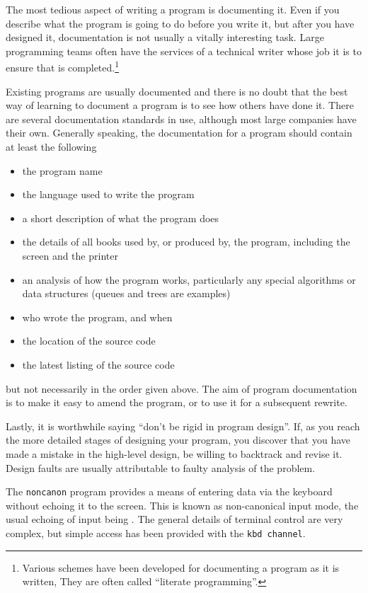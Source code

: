 The most tedious aspect of writing a program is documenting it.  Even
if you describe what the program is going to do before you write it,
but after you have designed it, documentation is not usually a
vitally interesting task. Large programming teams often have the
services of a technical writer whose job it is to ensure that
 is
completed.\footnote{Various schemes have been developed for
documenting a program as it is written, They are often called
``literate programming''.}

Existing programs are usually documented and there is no doubt that
the best way of learning to document a program is to see how others
have done it. There are several documentation standards in use,
although most large companies have their own. Generally speaking, the
documentation for a program should contain at least the following
\begin{itemize}
\item the program name
\item the language used to write the program
\item a short description of what the program does
\item the details of all books used by, or produced by, the program,
including the screen and the printer
\item an analysis of how the program works, particularly any special
algorithms or data structures (queues and trees are examples)
\item who wrote the program, and when
\item the location of the source code
\item the latest listing of the source code
\end{itemize}
but not necessarily in the order given above. The aim of program
documentation is to make it easy to amend the program, or to use it
for a subsequent rewrite.

Lastly, it is worthwhile saying ``don't be rigid in program design''.
If, as you reach the more detailed stages of designing your program,
you discover that you have made a mistake in the high-level design, be
willing to backtrack and revise it. Design faults are usually
attributable to faulty analysis of the problem.

The \verb|noncanon| program provides a means of entering data via the
keyboard without echoing it to the screen. This is known as
non-canonical input mode, the usual echoing of input being
. The general details of terminal control
are very complex, but simple access has been provided with the
\verb|kbd channel|.

